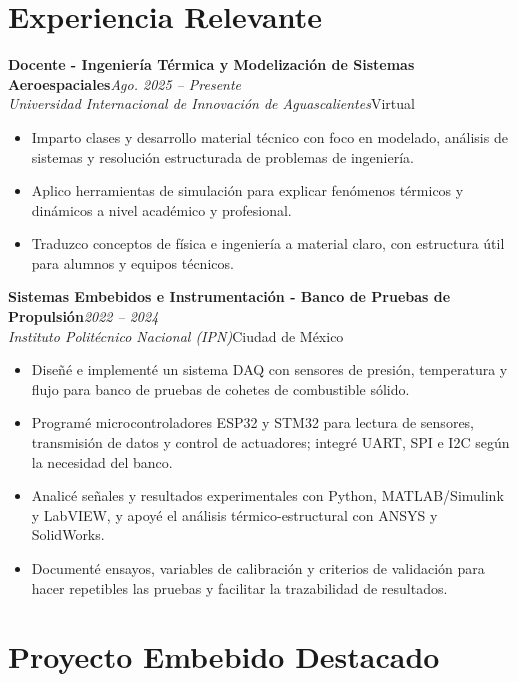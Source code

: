 \documentclass[10pt,a4paper]{article}
\newcommand{\resumeItem}[1]{\item\small #1}
\newcommand{\resumeSubheading}[4]{%
  \vspace{3pt}\noindent
  \textbf{#1}\hfill{\small\textit{\color{graytext}#2}}\\
  \textit{\color{graytext}#3}\hfill{\small\color{graytext}#4}\vspace{2pt}
}
\newcommand{\resumeItemListStart}{\begin{itemize}[leftmargin=1.15em,itemsep=1.5pt,topsep=2pt,partopsep=0pt,parsep=0pt]}
\newcommand{\resumeItemListEnd}{\end{itemize}\vspace{2pt}}
\begin{document}
\section{Experiencia Relevante}

\resumeSubheading
{Docente - Ingenier\'ia T\'ermica y Modelizaci\'on de Sistemas Aeroespaciales}{Ago. 2025 -- Presente}
{Universidad Internacional de Innovaci\'on de Aguascalientes}{Virtual}
\resumeItemListStart
  \resumeItem{Imparto clases y desarrollo material t\'ecnico con foco en modelado, an\'alisis de sistemas y resoluci\'on estructurada de problemas de ingenier\'ia.}
  \resumeItem{Aplico herramientas de simulaci\'on para explicar fen\'omenos t\'ermicos y din\'amicos a nivel acad\'emico y profesional.}
  \resumeItem{Traduzco conceptos de f\'isica e ingenier\'ia a material claro, con estructura \'util para alumnos y equipos t\'ecnicos.}
\resumeItemListEnd

\resumeSubheading
{Sistemas Embebidos e Instrumentaci\'on - Banco de Pruebas de Propulsi\'on}{2022 -- 2024}
{Instituto Polit\'ecnico Nacional (IPN)}{Ciudad de M\'exico}
\resumeItemListStart
  \resumeItem{Dise\~n\'e e implement\'e un sistema DAQ con sensores de presi\'on, temperatura y flujo para banco de pruebas de cohetes de combustible s\'olido.}
  \resumeItem{Program\'e microcontroladores ESP32 y STM32 para lectura de sensores, transmisi\'on de datos y control de actuadores; integr\'e UART, SPI e I2C seg\'un la necesidad del banco.}
  \resumeItem{Analic\'e se\~nales y resultados experimentales con Python, MATLAB/Simulink y LabVIEW, y apoy\'e el an\'alisis t\'ermico-estructural con ANSYS y SolidWorks.}
  \resumeItem{Document\'e ensayos, variables de calibraci\'on y criterios de validaci\'on para hacer repetibles las pruebas y facilitar la trazabilidad de resultados.}
\resumeItemListEnd

\section{Proyecto Embebido Destacado}
\end{document}
